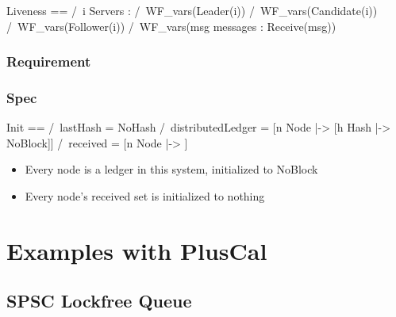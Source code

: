 \documentclass{report}
\begin{document}
\begin{tla}
Liveness == 
    /\ \A i \in Servers : 
        /\ WF_vars(Leader(i))
        /\ WF_vars(Candidate(i))
        /\ WF_vars(Follower(i))
    /\ WF_vars(\E msg \in messages : Receive(msg))
\end{tla}
\begin{tlatex}
%
%
%
%
%
\end{tlatex}



\section{Requirement}

\section{Spec}

\begin{tla}
Init ==
    /\ lastHash = NoHash
    /\ distributedLedger = [n \in Node |-> [h \in Hash |-> NoBlock]]
    /\ received = [n \in Node |-> {}]
\end{tla}
\begin{tlatex}
%
%
%
\end{tlatex}
\newline

\begin{itemize}
    \item Every node is a ledger in this system, initialized to NoBlock
    \item Every node's received set is initialized to nothing
\end{itemize}

\part{Examples with PlusCal}

\chapter{SPSC Lockfree Queue}
\end{document}

